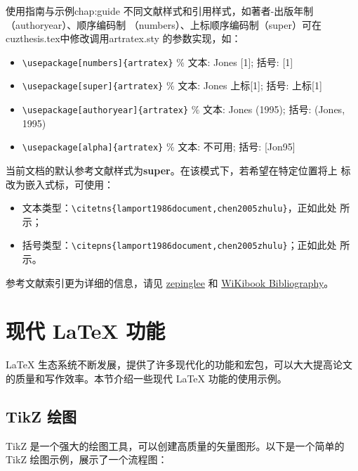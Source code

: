\begin{cuzchapter}{使用指南与示例}{chap:guide}
    不同文献样式和引用样式，如著者-出版年制（authoryear）、顺序编码制
    （numbers）、上标顺序编码制（super）可在cuzthesis.tex中修改调用artratex.sty
    的参数实现，如：
    \begin{itemize}
        \item \verb+\usepackage[numbers]{artratex}+ $\%$ 文本: Jones [1]; 括号: [1]
        \item \verb+\usepackage[super]{artratex}+ $\%$ 文本: Jones 上标[1]; 括号: 上标[1]
        \item \verb+\usepackage[authoryear]{artratex}+ $\%$ 文本: Jones (1995); 括号: (Jones, 1995)
        \item \verb+\usepackage[alpha]{artratex}+ $\%$ 文本: 不可用; 括号: [Jon95]
    \end{itemize}

    当前文档的默认参考文献样式为\textbf{super}。在该模式下，若希望在特定位置将上
    标改为嵌入式标，可使用：

    \begin{itemize}
        \item 文本类型：\verb|\citetns{lamport1986document,chen2005zhulu}|，正如此处
              所示；
        \item 括号类型：\verb|\citepns{lamport1986document,chen2005zhulu}|；正如此处
              所示。
    \end{itemize}

    参考文献索引更为详细的信息，请见
    \href{https://github.com/zepinglee/gbt7714-bibtex-style}{zepinglee} 和
    \href{https://en.wikibooks.org/wiki/LaTeX/Bibliography_Management}{WiKibook
        Bibliography}。


    \section{现代 \LaTeX{} 功能}\label{sec:modern-latex}

    \LaTeX{} 生态系统不断发展，提供了许多现代化的功能和宏包，可以大大提高论文的质量和写作效率。本节介绍一些现代 \LaTeX{} 功能的使用示例。

    \subsection{TikZ 绘图}\label{sub:tikz}

    TikZ 是一个强大的绘图工具，可以创建高质量的矢量图形。以下是一个简单的 TikZ 绘图示例，展示了一个流程图：


\end{cuzchapter}
